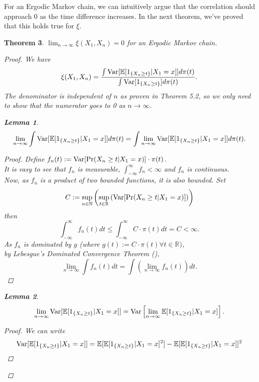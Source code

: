 \documentclass{article}
\newtheorem{theorem}{Theorem}[section]
\newtheorem{lemma}[theorem]{Lemma}
\begin{document}
	For an Ergodic Markov chain, we can intuitively argue that the correlation should approach $0$ as the time difference increases.
	In the next theorem, we've proved that this holds true for $\xi$.
	\begin{theorem}
		$\lim_{n \rightarrow \infty} \xi(X_1, X_{n}) = 0$ for an Ergodic Markov chain.
		\begin{proof}
			We have
			\begin{equation*}
				\xi(X_1, X_{n}) = \frac{\int \text{Var}[\mathbb{E}[1_{\{X_{n} \geq t\}}|X_1=x]] d\pi(t)}{\int \text{Var}[1_{\{X_{n} \geq t\}}] d\pi(t)}.
			\end{equation*}
			The denominator is independent of $n$ as proven in Theorem 5.2, so we only need to show that the numerator goes to 0 as $n \rightarrow \infty$.\\
			\begin{lemma}
				$$\lim_{n \rightarrow \infty} \int \text{Var}[\mathbb{E}[1_{\{X_{n} \geq t\}}|X_1=x]] d\pi(t) = \int \lim_{n \rightarrow \infty}\text{Var}[\mathbb{E}[1_{\{X_{n} \geq t\}}|X_1=x]] d\pi(t).$$
				\begin{proof}
					Define $f_n(t) := \text{Var}[\Pr(X_{n} \geq t | X_{1} = x)] \cdot \pi(t)$. \\
					It is easy to see that $f_n$ is measurable, $\int_{-\infty}^{\infty} f_n < \infty$ and $f_n$ is continuous.\\
					Now, as $f_n$ is a product of two bounded functions, it is also bounded.
					Set
					$$ C:= \sup_{n \in \mathbb{N}} \left(\sup_{t \in \mathbb{R}} \left(\text{Var}[\Pr(X_{n} \geq t | X_{1} = x)]\right)\right)$$
					then
					$$\int_{-\infty}^{\infty} f_n(t)dt \leq \int_{-\infty}^{\infty} C\cdot\pi(t)dt = C < \infty.$$
					As $f_n$ is dominated by $g$ (where $g(t) := C\cdot\pi(t) \forall t \in \mathbb{R})$, \\
					by Lebesgue's Dominated Convergence Theorem (\cite{kl2001chung}),
					$$\lim_{n \rightarrow \infty} \int f_n(t) dt = \int \left(\lim_{n \rightarrow \infty} f_n(t)\right) dt.$$
				\end{proof}
			\end{lemma}
			\begin{lemma}
				$$\lim_{n \rightarrow \infty} \text{Var}[\mathbb{E}[1_{\{X_{n} \geq t\}}|X_1=x]] = \text{Var}\left[\lim_{n \rightarrow \infty} \mathbb{E}[1_{\{X_{n} \geq t\}}|X_1=x]\right].$$
				\begin{proof}
					We can write
					\begin{align*}
						\Var[\mathbb{E}[1_{\{X_{n} \geq t\}}|X_1=x]] &= \mathbb{E}[\mathbb{E}[1_{\{X_{n} \geq t\}}|X_1=x]^2] - \mathbb{E}[\mathbb{E}[1_{\{X_{n} \geq t\}}|X_1=x]]^2 \\

\end{align*}
\end{proof}
\end{lemma}
\end{proof}
\end{theorem}
\end{document}
